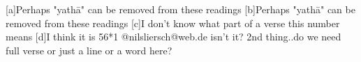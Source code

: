 




  

  

  [a]Perhaps "yathā" can be removed from these readings
  [b]Perhaps "yathā" can be removed from these readings
  [c]I don't know what part of a verse this number means
  [d]I think it is 56*1 @nilsliersch@web.de isn't it? 2nd thing..do we need full verse or just a line or a word here?